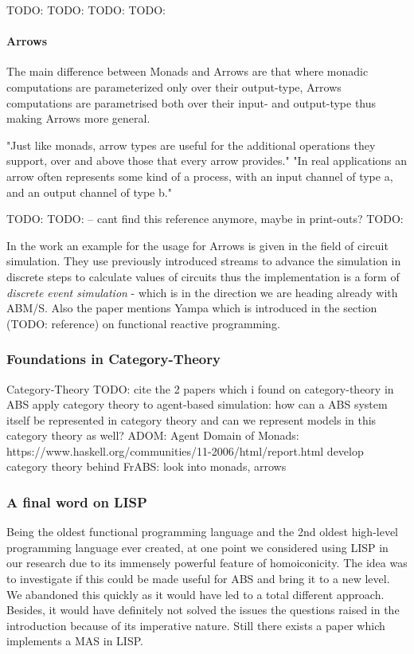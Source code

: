 TODO: \cite{moggi_computational_1989}
TODO: \cite{wadler_comprehending_1990}
TODO: \cite{wadler_monads_1995}
TODO: \cite{wadler_how_1997}

\paragraph{Arrows}
The main difference between Monads and Arrows are that where monadic computations are parameterized only over their output-type, Arrows computations are parametrised both over their input- and output-type thus making Arrows more general.

"Just like monads, arrow types are useful for the additional operations they support, over and above those that every arrow provides."
"In real applications an arrow often represents some kind of a process, with an input channel of type a, and an output channel of type b."

TODO: \cite{hughes_generalising_2000}
TODO: \cite{Hughes2004} -- cant find this reference anymore, maybe in print-outs?
TODO: \cite{hughes_programming_2005}

In the work \cite{Hughes2004} an example for the usage for Arrows is given in the field of circuit simulation. They use previously introduced streams to advance the simulation in discrete steps to calculate values of circuits thus the implementation is a form of \textit{discrete event simulation} - which is in the direction we are heading already with ABM/S. Also the paper mentions Yampa which is introduced in the section (TODO: reference) on functional reactive programming.

\subsubsection{Foundations in Category-Theory}
Category-Theory \cite{Pierce1991} \cite{spivak_category_2014}
TODO: cite the 2 papers which i found on category-theory in ABS
apply category theory to agent-based simulation: how can a ABS system itself be represented in category theory and can we represent models in this category theory as well?
ADOM: Agent Domain of Monads: https://www.haskell.org/communities/11-2006/html/report.html
develop category theory behind FrABS: look into monads, arrows

\subsubsection{A final word on LISP}
Being the oldest functional programming language and the 2nd oldest high-level programming language ever created, at one point we considered using LISP in our research due to its immensely powerful feature of homoiconicity. The idea was to investigate if this could be made useful for ABS and bring it to a new level. We abandoned this quickly as it would have led to a total different approach. Besides, it would have definitely not solved the issues the questions raised in the introduction because of its imperative nature. Still there exists a paper \cite{kawabe_nepi2programming_2000} which implements a MAS in LISP.